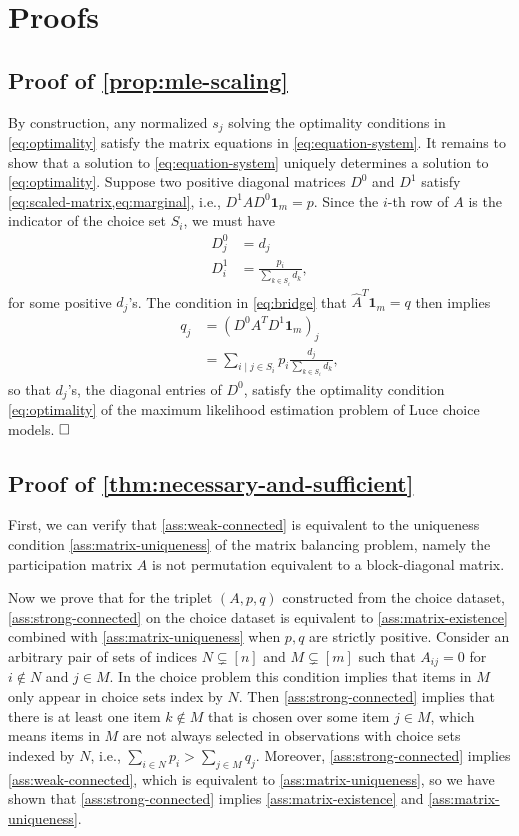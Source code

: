 \section{Proofs}
\label{app:proofs}
\subsection{Proof of \cref{prop:mle-scaling}}
By construction, any normalized $s_j$ solving the optimality conditions in \eqref{eq:optimality} satisfy the matrix equations in \eqref{eq:equation-system}. 
It remains to show that a solution to \eqref{eq:equation-system} uniquely determines a solution to \eqref{eq:optimality}. Suppose two positive diagonal matrices $D^{0}$ and $D^{1}$ satisfy \cref{eq:scaled-matrix,eq:marginal}, i.e., $D^{1}AD^{0}\mathbf{1}_m =p$. Since the $i$-th row of $A$ is the indicator of the choice set $S_i$, we must have
\begin{align*}
D_{j}^{0} & =d_{j}\\
D_{i}^{1} & =\frac{p_i}{\sum_{k\in S_{i}}d_{k}},
\end{align*}
 for some positive $d_j$'s. The condition in \eqref{eq:bridge} that $\hat{A}^{T}\mathbf{1}_m = q$ then implies 
\begin{align*}
   q_j &= (D^0A^TD^1\mathbf{1}_m)_j\\
   &= \sum_{i\mid j\in S_{i}}p_i\frac{d_{j}}{\sum_{k\in S_{i}}d_{k}},
\end{align*}
so that $d_j$'s, the diagonal entries of $D^0$, satisfy the optimality condition \eqref{eq:optimality} of the maximum likelihood estimation problem of Luce choice models. $\hfill \square$  

 \subsection{Proof of \cref{thm:necessary-and-sufficient}}
First, we can verify that \cref{ass:weak-connected} is equivalent to the uniqueness condition \cref{ass:matrix-uniqueness} of the matrix balancing problem, namely the participation matrix $A$ is not permutation equivalent to a block-diagonal matrix. 

Now we prove that for the triplet $(A,p,q)$ constructed from the choice dataset, \cref{ass:strong-connected} on the choice dataset is equivalent to \cref{ass:matrix-existence} combined with \cref{ass:matrix-uniqueness} when $p, q$ are strictly positive. Consider an arbitrary pair of sets of indices $N \subsetneq [n]$ and $M \subsetneq [m]$ such that $A_{ij}=0$ for $i\notin N$ and $j\in M$. In the choice problem this condition implies that items in $M$ only appear in choice sets index by $N$. Then \cref{ass:strong-connected} implies that there is at least one item $k\notin M$ that is chosen over some item $j \in M$, which means items in $M$ are not always selected in observations with choice sets indexed by $N$, i.e., $\sum_{i\in N}p_i > \sum_{j\in M}q_j$. Moreover, \cref{ass:strong-connected} implies \cref{ass:weak-connected}, which is equivalent to \cref{ass:matrix-uniqueness}, so we have shown that \cref{ass:strong-connected} implies \cref{ass:matrix-existence} and \cref{ass:matrix-uniqueness}.

